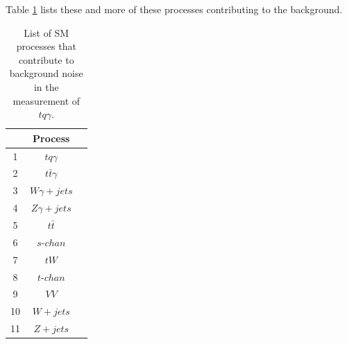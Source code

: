 Table \ref{tab:background} lists these and more of these processes contributing to the background.
\begin{table}
    \centering
    \begin{tabular}{c c c}
        \toprule
        {} & Process \\
        \midrule
        1 & $tq\gamma$\\[.1cm]
        2 & $t\bar{t}\gamma$\\[.1cm]
        3 & $W\gamma + jets$\\[.1cm]
        4 & $Z\gamma + jets$\\[.1cm]
        5 & $t\bar{t}$\\[.1cm]
        6 & $s\text{-}chan$\\[.1cm]
        7 & $t W$\\[.1cm]
        8 & $t\text{-}chan$\\[.1cm]
        9 & $VV$\\[.1cm]
        10& $W+jets$\\[.1cm]
        11& $Z+jets$\\[.1cm]
        \bottomrule
    \end{tabular}
    \caption{List of SM processes that contribute to background noise in the measurement of $tq\gamma$.}
    \label{tab:background}
\end{table}





